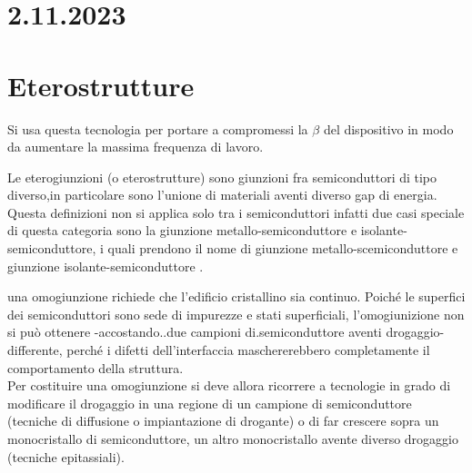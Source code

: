 \section*{2.11.2023}
\section{Eterostrutture}
Si usa questa tecnologia per portare a compromessi la $\beta$ del dispositivo in modo da aumentare la massima frequenza di lavoro.

Le eterogiunzioni (o eterostrutture) sono giunzioni fra semiconduttori di tipo diverso,in particolare sono l'unione di materiali aventi diverso gap di energia.
Questa definizioni non si applica solo tra i semiconduttori infatti
due casi speciale di questa categoria sono la giunzione metallo-semiconduttore e isolante-semiconduttore, i quali prendono il nome di giunzione metallo-scemiconduttore e giunzione isolante-semiconduttore .

\begin{psbox}
una omogiunzione richiede che l’edificio cristallino sia continuo.
Poiché le superfici dei semiconduttori sono sede di impurezze e stati superficiali, l’omogiunizione non si può ottenere -accostando..due campioni di.semiconduttore aventi drogaggio-differente, perché i difetti dell’interfaccia maschererebbero completamente il comportamento della struttura.\\
Per costituire una omogiunzione si deve allora ricorrere a tecnologie in grado di modificare il drogaggio in una regione di un campione di semiconduttore (tecniche di diffusione o impiantazione
di drogante) o di far crescere sopra un monocristallo di semiconduttore, un altro monocristallo avente diverso drogaggio (tecniche epitassiali).

\end{psbox}

